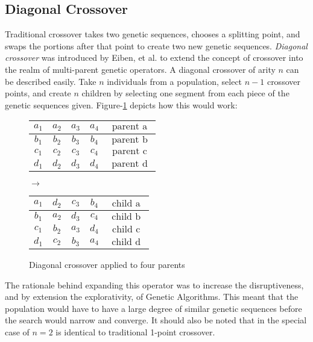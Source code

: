 \subsection*{Diagonal Crossover}
Traditional crossover takes two genetic sequences, chooses a splitting point, and swaps the portions after that point to create two new genetic sequences. \emph{Diagonal crossover} was introduced by Eiben, et al. to extend the concept of crossover into the realm of multi-parent genetic operators\cite{Eiben03}. A diagonal crossover of arity $n$ can be described easily. Take $n$ individuals from a population, select $n-1$ crossover points, and create $n$ children by selecting one segment from each piece of the genetic sequences given\cite{Eiben95}. Figure-\ref{DC-Fig} depicts how this would work\cite{Eiben95}:
\begin{figure}[h!]
\centering
\begin{tabular}{ | c | c | c | c | c | }
\hline
$a_1$ & $a_2$ & $a_3$ & $a_4$ & $\text{ parent a }$ 	\\ \hline
$b_1$ & $b_2$ & $b_3$ & $b_4$ & $\text{ parent b }$ 	\\ \hline
$c_1$ & $c_2$ & $c_3$ & $c_4$ & $\text{ parent c }$ 	\\ \hline
$d_1$ & $d_2$ & $d_3$ & $d_4$ & $\text{ parent d }$ 	\\ \hline
\end{tabular}
$\rightarrow$
\begin{tabular}{ | c | c | c | c | c | }
\hline
$a_1$ & $d_2$ & $c_3$ & $b_4$ & $\text{ child a }$ 	\\ \hline
$b_1$ & $a_2$ & $d_3$ & $c_4$ & $\text{ child b }$ 	\\ \hline
$c_1$ & $b_2$ & $a_3$ & $d_4$ & $\text{ child c }$ 	\\ \hline
$d_1$ & $c_2$ & $b_3$ & $a_4$ & $\text{ child d }$ 	\\ \hline
\end{tabular}
\caption{Diagonal crossover applied to four parents}
\label{DC-Fig}
\end{figure} 

The rationale behind expanding this operator was to increase the disruptiveness, and by extension the explorativity, of Genetic Algorithms\cite{Eiben97}. This meant that the population would have to have a large degree of similar genetic sequences before the search would narrow and converge\cite{Eiben95}. It should also be noted that in the special case of $n = 2$ is identical to traditional 1-point crossover\cite{Eiben95}.

